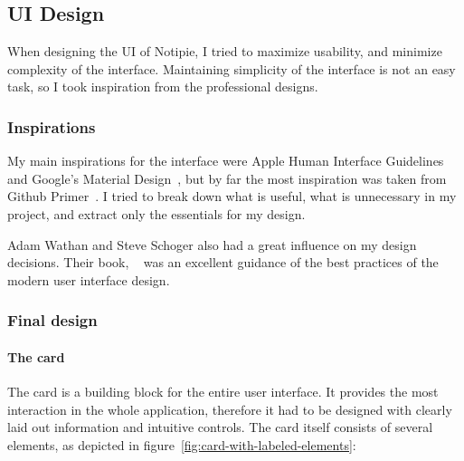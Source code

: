 \subsection{UI Design}\label{sec:ui-design}

When designing the UI of Notipie,
I tried to maximize usability,
and minimize complexity of the interface.
Maintaining simplicity of the interface is not an easy task,
so I took inspiration from the professional designs.

\subsubsection{Inspirations}\label{sec:inspirations}

My main inspirations for the interface were
Apple Human Interface Guidelines~\cite{apple_inc_human_2022}
and Google's Material Design~\cite{google_llc_material_2022},
but by far the most inspiration was taken from
Github Primer~\cite{github_inc_primer_2022}.
I tried to break down what is useful,
what is unnecessary in my project,
and extract only the essentials for my design.

Adam Wathan and Steve Schoger
also had a great influence
on my design decisions.
Their book,
~\cite{wathan_refactoring_2018}
was an excellent guidance of the best practices
of the modern user interface design.

\subsubsection{Final design}\label{sec:final-design}

\paragraph*{The card}\label{par:the-card}

The card is a building block for the entire user interface.
It provides the most interaction in the whole application,
therefore it had to be designed with clearly laid out information
and intuitive controls.
The card itself consists of several elements,
as depicted in figure~\ref{fig:card-with-labeled-elements}:

